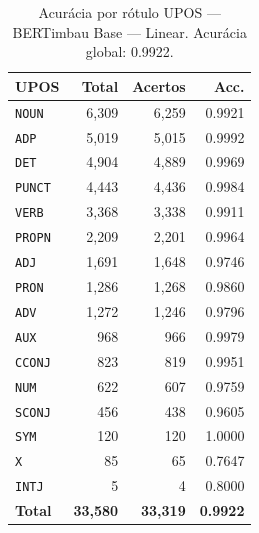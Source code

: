 \begin{table}[ht]
\centering
\footnotesize
\begin{tabular}{lrrr}
\toprule
\textbf{UPOS} & \textbf{Total} & \textbf{Acertos} & \textbf{Acc.} \\
\midrule
\texttt{NOUN} & 6,309 & 6,259 & 0.9921 \\
\texttt{ADP} & 5,019 & 5,015 & 0.9992 \\
\texttt{DET} & 4,904 & 4,889 & 0.9969 \\
\texttt{PUNCT} & 4,443 & 4,436 & 0.9984 \\
\texttt{VERB} & 3,368 & 3,338 & 0.9911 \\
\texttt{PROPN} & 2,209 & 2,201 & 0.9964 \\
\texttt{ADJ} & 1,691 & 1,648 & 0.9746 \\
\texttt{PRON} & 1,286 & 1,268 & 0.9860 \\
\texttt{ADV} & 1,272 & 1,246 & 0.9796 \\
\texttt{AUX} & 968 & 966 & 0.9979 \\
\texttt{CCONJ} & 823 & 819 & 0.9951 \\
\texttt{NUM} & 622 & 607 & 0.9759 \\
\texttt{SCONJ} & 456 & 438 & 0.9605 \\
\texttt{SYM} & 120 & 120 & 1.0000 \\
\texttt{X} & 85 & 65 & 0.7647 \\
\texttt{INTJ} & 5 & 4 & 0.8000 \\
\midrule
\textbf{Total} & \textbf{33,580} & \textbf{33,319} & \textbf{0.9922} \\
\bottomrule
\end{tabular}
\caption{Acurácia por rótulo UPOS — BERTimbau Base — Linear. Acurácia global: 0.9922.}
\label{tab:upos-acc-predict-test-df-bertimbau-base-linear}
\end{table}


